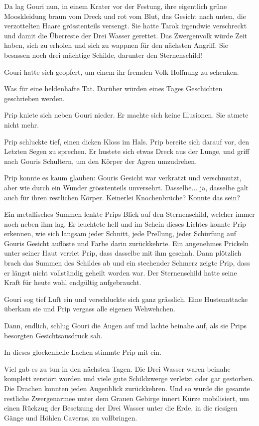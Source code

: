 \documentclass[10pt, a4paper, oneside]{book}
\begin{document}
Da lag Gouri nun, in einem Krater vor der Festung, ihre eigentlich grüne Mooskleidung braun vom Dreck und rot vom Blut, das Gesicht nach unten, die verzottelten Haare grösstenteils versengt. Sie hatte Tarok irgendwie verschreckt und damit die Überreste der Drei Wasser gerettet. Das Zwergenvolk würde Zeit haben, sich zu erholen und sich zu wappnen für den nächsten Angriff. Sie besassen noch drei mächtige Schilde, darunter den Sternenschild!

Gouri hatte sich geopfert, um einem ihr fremden Volk Hoffnung zu schenken.

Was für eine heldenhafte Tat. Darüber würden eines Tages Geschichten geschrieben werden.

Prip kniete sich neben Gouri nieder. Er machte sich keine Illusionen. Sie atmete nicht mehr.

Prip schluckte tief, einen dicken Kloss im Hals. Prip bereite sich darauf vor, den Letzten Segen zu sprechen. Er hustete sich etwas Dreck aus der Lunge, und griff nach Gouris Schultern, um den Körper der Agren umzudrehen.

Prip konnte es kaum glauben: Gouris Gesicht war verkratzt und verschmutzt, aber wie durch ein Wunder grösstenteils unversehrt. Dasselbe... ja, dasselbe galt auch für ihren restlichen Körper. Keinerlei Knochenbrüche? Konnte das sein?

Ein metallisches Summen lenkte Prips Blick auf den Sternenschild, welcher immer noch neben ihm lag. Er leuchtete hell und im Schein dieses Lichtes konnte Prip erkennen, wie sich langsam jeder Schnitt, jede Prellung, jeder Schürfung auf Gouris Gesicht auflöste und Farbe darin zurückkehrte. Ein angenehmes Prickeln unter seiner Haut verriet Prip, dass dasselbe mit ihm geschah. Dann plötzlich brach das Summen des Schildes ab und ein stechender Schmerz zeigte Prip, dass er längst nicht vollständig geheilt worden war. Der Sternenschild hatte seine Kraft für heute wohl endgültig aufgebraucht.

Gouri sog tief Luft ein und verschluckte sich ganz grässlich. Eine Hustenattacke überkam sie und Prip vergass alle eigenen Wehwehchen.

Dann, endlich, schlug Gouri die Augen auf und lachte beinahe auf, als sie Prips besorgten Gesichtsausdruck sah.

In dieses glockenhelle Lachen stimmte Prip mit ein.\bigskip



Viel gab es zu tun in den nächsten Tagen. Die Drei Wasser waren beinahe komplett zerstört worden und viele gute Schildzwerge verletzt oder gar gestorben. Die Drachen konnten jeden Augenblick zurückkehren. Und so wurde die gesamte restliche Zwergenarmee unter dem Grauen Gebirge innert Kürze mobilisiert, um einen Rückzug der Besetzung der Drei Wasser unter die Erde, in die riesigen Gänge und Höhlen Caverns, zu vollbringen.
\end{document}
